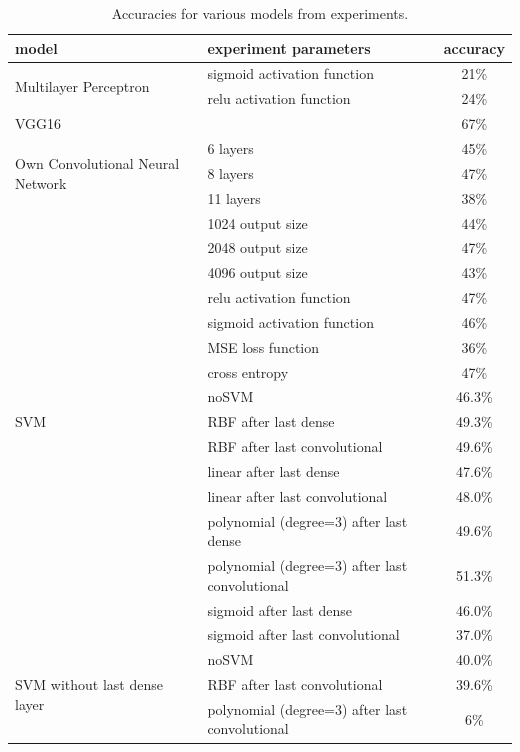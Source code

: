 \documentclass[a4paper]{article}
\begin{document}
\begin{table}[!hbt]
    \caption{Accuracies for various models from experiments.
    \label{table:summary}
    }
\begin{center}
    \begin{tabular}{| l | l | c |}
    \hline
    model & experiment parameters & accuracy \\ \hline
    
    \multirow{2}{*}{Multilayer Perceptron} & sigmoid activation function & 21\% \\
	& relu activation function & 24\% \\ \hline
	
	VGG16 & & 67\% \\ \hline

	 \multirow{3}{*}{Own Convolutional Neural Network} & 6 layers & 45\% \\
	& 8 layers & 47\% \\
	& 11 layers & 38\% \\ \cline{2-3}
	
	& 1024 output size & 44\% \\
	& 2048 output size & 47\% \\ 
	& 4096 output size & 43\% \\ \cline{2-3}

	& relu activation function & 47\% \\
	& sigmoid activation function & 46\% \\ \cline{2-3}

	& MSE loss function & 36\% \\
	& cross entropy & 47\% \\ \hline	
	
	 \multirow{3}{*}{SVM} & noSVM & 46.3\% \\ \cline{2-3}
    & RBF after last dense & 49.3\% \\
    & RBF after last convolutional & 49.6\% \\ \cline{2-3}
    & linear after last dense & 47.6\% \\
    & linear after last convolutional & 48.0\% \\ \cline{2-3}
    & polynomial (degree=3) after last dense & 49.6\% \\
    & polynomial (degree=3) after last convolutional & 51.3\% \\ \cline{2-3}
    & sigmoid after last dense & 46.0\% \\
    & sigmoid after last convolutional & 37.0\% \\ \hline
    
     \multirow{3}{*}{SVM without last dense layer} &  noSVM & 40.0\% \\ \cline{2-3}
     & RBF after last convolutional & 39.6\% \\
     & polynomial (degree=3) after last convolutional & 6\% \\ \hline
    \end{tabular}
\end{center}
\end{table}
\end{document}
